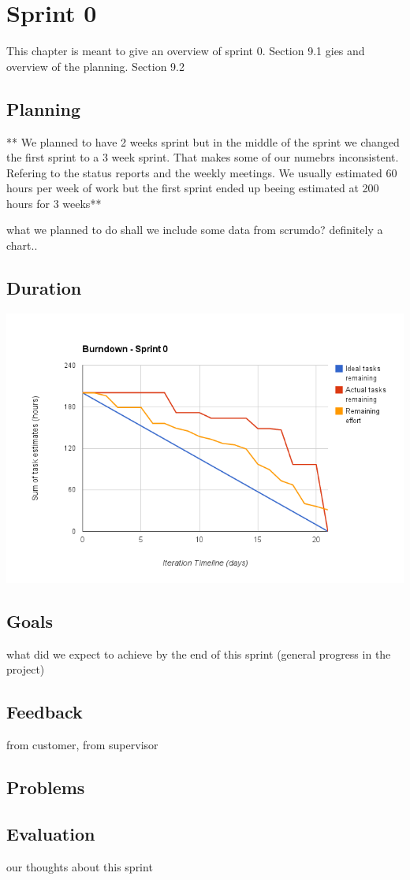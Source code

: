 
\chapter{Sprint 0} %

\label{Sprint 0} %

This chapter is meant to give an overview of sprint 0. 
Section 9.1 gies and overview of the planning.
Section 9.2

\section{Planning}

** We planned to have 2 weeks sprint but in the middle of the sprint we changed the first sprint to a 3 week sprint. That makes some of our numebrs inconsistent. Refering to the status reports and the weekly meetings. We usually estimated 60 hours per week of work but the first sprint ended up beeing estimated at 200 hours for 3 weeks**


what we planned to do
shall we include some data from scrumdo? definitely a chart..
\section{Duration}
\includegraphics[scale=0.6]{./Figures/burndownSprint0.png}
\section{Goals}
what did we expect to achieve by the end of this sprint (general progress in the project)
\section{Feedback}
from customer, from supervisor
\section{Problems}

\section{Evaluation}
our thoughts about this sprint
